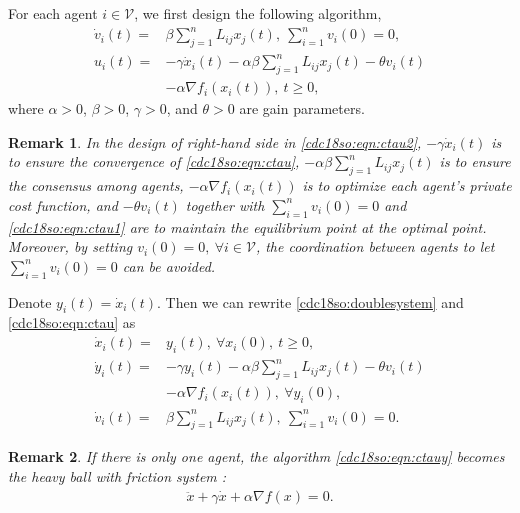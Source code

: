 \documentclass[letterpaper, 10 pt, conference]{ieeeconf}  %
\newtheorem{remark}{Remark}
\begin{document}
For each agent $i\in\mathcal V$, we first design the following algorithm,
\begin{subequations}\label{cdc18so:eqn:ctau}
\begin{align}
  \dot{v}_i(t) = &\beta \sum_{j=1}^{n} L_{ij} x_j(t),~\sum_{i=1}^nv_i(0)=0,\label{cdc18so:eqn:ctau1}\\
  u_i(t) = & - \gamma \dot{x}_i(t)-\alpha \beta \sum_{j=1}^{n} L_{ij}x_j(t) - \theta v_i(t)\nonumber\\
  & - \alpha \nabla f_i(x_i(t)), ~t\ge0, \label{cdc18so:eqn:ctau2}
\end{align}
\end{subequations}
where $\alpha>0$, $\beta>0$, $\gamma>0$, and $\theta>0$ are gain parameters.
\begin{remark}
In the design of right-hand side in \eqref{cdc18so:eqn:ctau2}, $- \gamma \dot{x}_i(t)$ is to ensure the convergence of \eqref{cdc18so:eqn:ctau}, $-\alpha\beta \sum_{j=1}^{n} L_{ij}x_j(t)$ is to ensure the consensus among agents, $- \alpha \nabla f_i(x_i(t))$ is to optimize each agent's private cost function, and $-\theta v_i(t)$ together with $\sum_{i=1}^nv_i(0)=0$ and \eqref{cdc18so:eqn:ctau1} are to maintain the equilibrium point at the optimal point. Moreover, by setting $v_i(0)=0,~\forall i\in\mathcal{V}$, the coordination between agents to let $\sum_{i=1}^nv_i(0)=0$ can be avoided.
\end{remark}

Denote $y_i(t)=\dot{x}_i(t)$. Then we can rewrite \eqref{cdc18so:doublesystem} and \eqref{cdc18so:eqn:ctau} as
\begin{subequations}\label{cdc18so:eqn:ctauy}
\begin{align}
    \dot{x}_i(t) =&y_i(t),~\forall x_i(0),~t\ge0,\label{cdc18so:eqn:ctauy2}\\
  \dot{y}_i(t) =  & - \gamma y_i(t)-\alpha\beta \sum_{j=1}^{n} L_{ij} x_j(t) -\theta  v_i(t)\nonumber\\
  & - \alpha \nabla f_i(x_i(t)),~\forall y_i(0), \label{cdc18so:eqn:ctauy3}\\
  \dot{v}_i(t) = &\beta \sum_{j=1}^{n} L_{ij} x_j(t),~\sum_{i=1}^nv_i(0)=0.\label{cdc18so:eqn:ctauy1}
\end{align}
\end{subequations}

%
%
%
\begin{remark}
If there is only one agent, the algorithm \eqref{cdc18so:eqn:ctauy} becomes the heavy ball with friction system \cite{attouch2000heavy}:
\begin{align*}
\ddot{x}+\gamma \dot{x}+\alpha\nabla f(x)=0.
\end{align*}
\end{remark}
\end{document}
